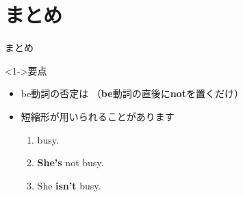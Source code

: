 \documentclass[aspectratio=169,xcolor={dvipsnames,table}]{beamer}
\begin{document}
\section{まとめ}
\begin{frame}[plain]{まとめ}

\begin{block}<1->{要点}
\begin{itemize}[square]
 \item<1->  be動詞の否定は\,\,（\textbf{be}動詞の直後に\textbf{not}を置くだけ） 
 \item<2-> 短縮形が用いられることがあります
       \begin{enumerate}[circle]
	\item<3->  busy.
	\item<5-> \textbf{She's} not busy.
	\item<7-> She \textbf{isn't} busy.
       \end{enumerate}
\end{itemize}
\end{block}
\end{frame}
\end{document}
